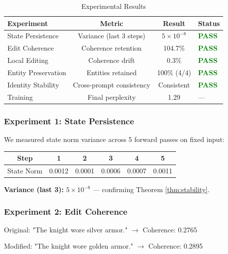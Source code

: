 \documentclass[11pt,a4paper]{article}
\begin{document}
\begin{table}[h]
\centering
\caption{Experimental Results}
\label{tab:results}
\begin{tabular}{lccl}
\toprule
\textbf{Experiment} & \textbf{Metric} & \textbf{Result} & \textbf{Status} \\
\midrule
State Persistence & Variance (last 3 steps) & $5 \times 10^{-8}$ & \textcolor{green}{\textbf{PASS}} \\
Edit Coherence & Coherence retention & 104.7\% & \textcolor{green}{\textbf{PASS}} \\
Local Editing & Coherence drift & 0.3\% & \textcolor{green}{\textbf{PASS}} \\
Entity Preservation & Entities retained & 100\% (4/4) & \textcolor{green}{\textbf{PASS}} \\
Identity Stability & Cross-prompt consistency & Consistent & \textcolor{green}{\textbf{PASS}} \\
\midrule
Training & Final perplexity & 1.29 & — \\
\bottomrule
\end{tabular}
\end{table}

\subsubsection{Experiment 1: State Persistence}

We measured state norm variance across 5 forward passes on fixed input:

\begin{center}
\begin{tabular}{cccccc}
\toprule
Step & 1 & 2 & 3 & 4 & 5 \\
\midrule
State Norm & 0.0012 & 0.0001 & 0.0006 & 0.0007 & 0.0011 \\
\bottomrule
\end{tabular}
\end{center}

\textbf{Variance (last 3):} $5 \times 10^{-8}$ — confirming Theorem \ref{thm:stability}.

\subsubsection{Experiment 2: Edit Coherence}

Original: "The knight wore silver armor." $\rightarrow$ Coherence: 0.2765

Modified: "The knight wore golden armor." $\rightarrow$ Coherence: 0.2895
\end{document}
